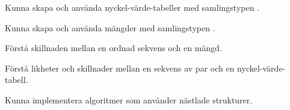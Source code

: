 
\item Kunna skapa och använda nyckel-värde-tabeller med samlingstypen .
\item Kunna skapa och använda mängder med samlingstypen .
\item Förstå skillnaden mellan en ordnad sekvens och en mängd.
\item Förstå likheter och skillnader mellan en sekvens av par och en nyckel-värde-tabell. 
\item Kunna implementera algoritmer som använder nästlade strukturer. 
